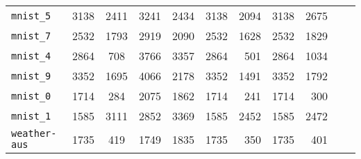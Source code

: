 \begin{tabular}{lccrrrrrrrr}
\texttt{mnist\_5} & 3138 & 2411 & 3241 & 2434 & 3138 & 2094 & 3138 & 2675\\
\texttt{mnist\_7} & 2532 & 1793 & 2919 & 2090 & 2532 & 1628 & 2532 & 1829\\
\texttt{mnist\_4} & 2864 & 708 & 3766 & 3357 & 2864 & 501 & 2864 & 1034\\
\texttt{mnist\_9} & 3352 & 1695 & 4066 & 2178 & 3352 & 1491 & 3352 & 1792\\
\texttt{mnist\_0} & 1714 & 284 & 2075 & 1862 & 1714 & 241 & 1714 & 300\\
\texttt{mnist\_1} & 1585 & 3111 & 2852 & 3369 & 1585 & 2452 & 1585 & 2472\\
\texttt{weather-aus} & 1735 & 419 & 1749 & 1835 & 1735 & 350 & 1735 & 401\\
\bottomrule
\end{tabular}
